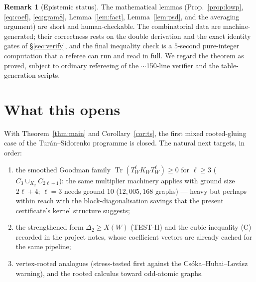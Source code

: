 \documentclass[11pt]{article}
\theoremstyle{definition}
\newtheorem{remark}[theorem]{Remark}
\newcommand{\Tr}{\operatorname{Tr}}
\newcommand{\tw}{T_W}
\begin{document}
\begin{remark}[Epistemic status]
The mathematical lemmas (Prop.~\ref{prop:lowp}, \eqref{eq:coef},
\eqref{eq:gram8}, Lemma~\ref{lem:fact}, Lemma~\ref{lem:psd}, and the averaging
argument) are short and human-checkable.  The combinatorial data are
machine-generated; their correctness rests on the double derivation and the
exact identity gates of \S\ref{sec:verify}, and the final inequality check is
a $5$-second pure-integer computation that a referee can run and read in
full.  We regard the theorem as proved, subject to ordinary refereeing of the
$\sim$150-line verifier and the table-generation scripts.
\end{remark}

\section{What this opens}

With Theorem~\ref{thm:main} and Corollary~\ref{cor:ts}, the first mixed
rooted-gluing case of the Tur\'an--Sidorenko programme is closed.  The natural
next targets, in order:
\begin{enumerate}[leftmargin=1.6em]
\item the smoothed Goodman family
$\Tr(\tw^{\ell}K_W\tw^{\ell})\ge0$ for $\ell\ge3$
\textup{(}$C_3\cup_{K_2}C_{2\ell+1}$\textup{)}: the same multiplier machinery
applies with ground size $2\ell+4$; $\ell=3$ needs ground $10$
($12{,}005{,}168$ graphs) --- heavy but perhaps within reach with the
block-diagonalisation savings that the present certificate's kernel structure
suggests;
\item the strengthened form $\Delta_2\ge X(W)$ (TEST-H) and the cubic
inequality (C) recorded in the project notes, whose coefficient vectors are
already cached for the same pipeline;
\item vertex-rooted analogues (stress-tested first against the
Cs\'oka--Hubai--Lov\'asz warning), and the rooted calculus toward odd-atomic
graphs.
\end{enumerate}
\end{document}
